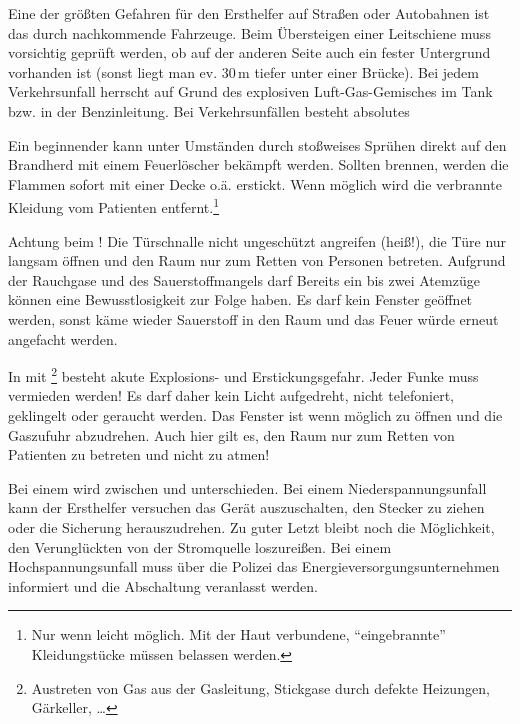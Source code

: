 {
Eine der größten Gefahren für den Ersthelfer auf Straßen oder
    Autobahnen ist das  durch
    nachkommende Fahrzeuge. Beim Übersteigen einer Leitschiene muss vorsichtig geprüft werden, ob
    auf der anderen Seite auch ein fester Untergrund vorhanden ist (sonst liegt
    man ev. 30\,m tiefer unter einer Brücke).
Bei jedem Verkehrsunfall herrscht 
    auf Grund des explosiven Luft-Gas-Gemisches im Tank bzw. in der
    Benzinleitung. Bei Verkehrsunfällen besteht
    absolutes
    


Ein beginnender  kann unter Umständen
durch stoßweises Sprühen direkt auf den Brandherd mit einem Feuerlöscher bekämpft
werden. Sollten  brennen, werden die Flammen
sofort mit einer Decke o.ä. erstickt. Wenn möglich
wird die verbrannte Kleidung vom Patienten
entfernt.\footnote{Nur wenn leicht möglich. Mit der Haut
verbundene, "`eingebrannte"' Kleidungstücke müssen belassen werden.}

Achtung beim ! Die
Türschnalle nicht ungeschützt angreifen (heiß!), die Türe
nur langsam öffnen und den Raum nur zum Retten von Personen
betreten. Aufgrund der Rauchgase und des Sauerstoffmangels
darf  Bereits ein bis zwei
Atemzüge können eine Bewusstlosigkeit zur Folge haben. Es
darf kein Fenster geöffnet werden, sonst käme wieder
Sauerstoff in den Raum und das Feuer würde erneut angefacht
werden.
	
	In mit \footnote{Austreten von Gas aus der
	Gasleitung, Stickgase durch defekte Heizungen, Gärkeller, \ldots} besteht 
	akute Explosions- und Erstickungsgefahr. Jeder Funke muss vermieden werden! Es
	darf daher kein Licht aufgedreht, nicht telefoniert, geklingelt oder geraucht
	werden. Das Fenster ist wenn möglich zu öffnen und die Gaszufuhr abzudrehen. 
	Auch hier gilt es, den Raum nur zum Retten von Patienten zu betreten und nicht zu atmen!
	
	Bei einem  wird zwischen
	 und  unterschieden. Bei einem
	Niederspannungsunfall kann der Ersthelfer versuchen das Gerät auszuschalten,
	den Stecker zu ziehen oder die Sicherung herauszudrehen. Zu guter Letzt bleibt
	noch die Möglichkeit, den Verunglückten von der Stromquelle loszureißen. Bei
	einem Hochspannungsunfall muss über die
	Polizei das Energieversorgungsunternehmen informiert und die Abschaltung 
	veranlasst werden.

}
